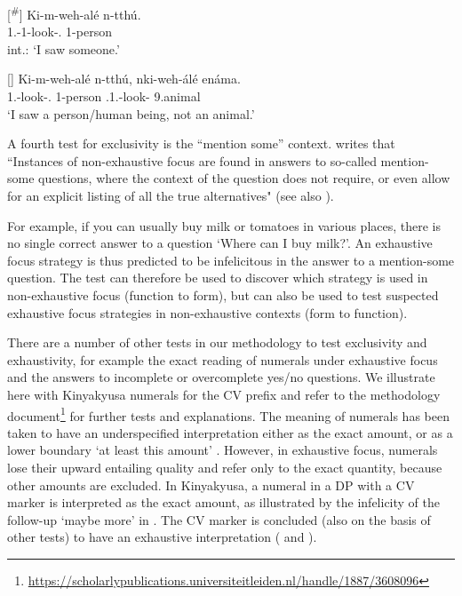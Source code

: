 \documentclass[output=paper]{langscibook}
\begin{document}
\ex
\begin{xlist}
\exi{\CJ}
[\textsuperscript{\#}]{
\label{bkm:Ref122698002:b}
\gll
Ki-m-weh-alé  n-tthú.\\
1\SG.\SM{}-1\OM{}-look-\PFV{}.\CJ{}  1-person\\
\glt
int.: ‘I saw someone.’\\
}
\end{xlist}


\ex
\begin{xlist}
\exi{\CJ}
[]{
\label{bkm:Ref122698002:c}
\gll
Ki-m-weh-alé  n-tthú,  nki-weh-álé  enáma.\\
1\SG{}.\OM{}-look-\PFV{}.\CJ{}  1-person  \NEG{}.1\SG.\SM{}-look-\PFV{}  9.animal\\
\glt
‘I saw a person/human being, not an animal.’\\
}
\end{xlist}

\z
\z


A fourth test for exclusivity is the “mention some” context.  writes that “Instances of non-exhaustive focus are found in answers to so-called mention-some questions, where the context of the question does not require, or even allow for an explicit listing of all the true alternatives" (see also \citealt{AbelsMuriungi2008}).

For example, if you can usually buy milk or tomatoes in various places, there is no single correct answer to a question ‘Where can I buy milk?’. An exhaustive focus strategy is thus predicted to be infelicitous in the answer to a mention-some question. The test can therefore be used to discover which strategy is used in non-exhaustive focus (function to form), but can also be used to test suspected exhaustive focus strategies in non-exhaustive contexts (form to function).

There are a number of other tests in our methodology to test exclusivity and exhaustivity, for example the exact reading of numerals under exhaustive focus and the answers to incomplete or overcomplete yes/no questions. We illustrate here with Kinyakyusa numerals for the CV prefix and refer to the methodology document\footnote{\url{https://scholarlypublications.universiteitleiden.nl/handle/1887/3608096}} for further tests and explanations. The meaning of numerals has been taken to have an underspecified interpretation either as the exact amount, or as a lower boundary ‘at least this amount’ \citep{Horn1972,Levinson2000}. However, in exhaustive focus, numerals lose their upward entailing quality and refer only to the exact quantity, because other amounts are excluded. In Kinyakyusa, a numeral in a DP with a CV marker is interpreted as the exact amount, as illustrated by the infelicity of the follow-up ‘maybe more’ in . The CV marker is concluded (also on the basis of other tests) to have an exhaustive interpretation (\citealt{vanderWalLusekelo2022} and ).
\end{document}
